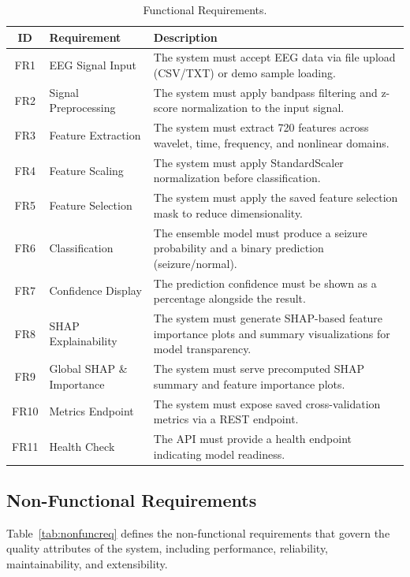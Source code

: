 \begin{table}[htbp]
\centering
\caption{Functional Requirements.}
\label{tab:funcreq}
\begin{tabular}{|c|p{4cm}|p{6.5cm}|}
\hline
\textbf{ID} & \textbf{Requirement} & \textbf{Description} \\
\hline
FR1 & EEG Signal Input & The system must accept EEG data via file upload (CSV/TXT) or demo sample loading. \\
\hline
FR2 & Signal Preprocessing & The system must apply bandpass filtering and z-score normalization to the input signal. \\
\hline
FR3 & Feature Extraction & The system must extract 720 features across wavelet, time, frequency, and nonlinear domains. \\
\hline
FR4 & Feature Scaling & The system must apply StandardScaler normalization before classification. \\
\hline
FR5 & Feature Selection & The system must apply the saved feature selection mask to reduce dimensionality. \\
\hline
FR6 & Classification & The ensemble model must produce a seizure probability and a binary prediction (seizure/normal). \\
\hline
FR7 & Confidence Display & The prediction confidence must be shown as a percentage alongside the result. \\
\hline
FR8 & SHAP Explainability & The system must generate SHAP-based feature importance plots and summary visualizations for model transparency. \\
\hline
FR9 & Global SHAP \& Importance & The system must serve precomputed SHAP summary and feature importance plots. \\
\hline
FR10 & Metrics Endpoint & The system must expose saved cross-validation metrics via a REST endpoint. \\
\hline
FR11 & Health Check & The API must provide a health endpoint indicating model readiness. \\
\hline
\end{tabular}
\end{table}

\subsection{Non-Functional Requirements}

Table~\ref{tab:nonfuncreq} defines the non-functional requirements that govern the quality attributes of the system, including performance, reliability, maintainability, and extensibility.

